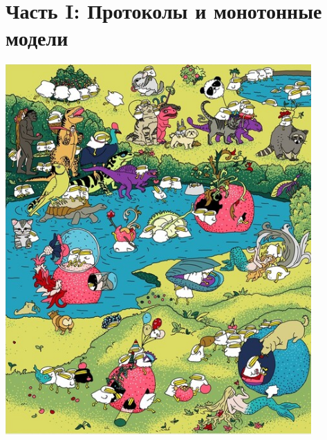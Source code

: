 \section{Часть I: Протоколы и монотонные модели}

\begin{frame}
    \centering
    \insertsectionhead

    \vspace{0.3cm}
    \includegraphics[scale = 0.3]{pics/utia-garden.png}
\end{frame}

